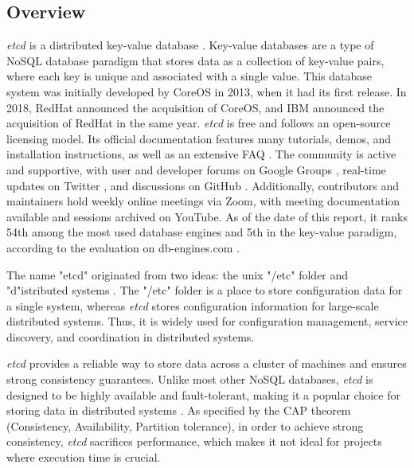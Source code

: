 \documentclass[screen,review]{acmart}
\begin{document}
\subsection{Overview}
\textit{etcd} is a distributed key-value database \cite{key}. Key-value databases are a type of NoSQL database paradigm that stores data as a collection of key-value pairs, where each key is unique and associated with a single value.
This database system was initially developed by CoreOS \cite{core} in 2013, when it had its first release. In 2018, RedHat announced the acquisition of CoreOS, and IBM \cite{ibm} announced the acquisition of RedHat \cite{red} in the same year.
\textit{etcd} is free and follows an open-source licensing model. Its official documentation \cite{documentation} features many tutorials, demos, and installation instructions, as well as an extensive FAQ \cite{etcd_faq}. The community \cite{com} is active and supportive, with user and developer forums on Google Groups \cite{google}, real-time updates on Twitter \cite{twitter}, and discussions on GitHub \cite{github}. Additionally, contributors and maintainers hold weekly online meetings via Zoom, with meeting documentation available and sessions archived on YouTube. As of the date of this report, it ranks 54th among the most used database engines and 5th in the key-value paradigm, according to the evaluation on db-engines.com \cite{db-engines}.

The name "etcd" originated from two ideas: the unix "/etc" folder and "d"istributed systems \cite{dbdb}. The "/etc" folder is a place to store configuration data for a single system, whereas \textit{etcd} stores configuration information for large-scale distributed systems. Thus, it is widely used for configuration management, service discovery, and coordination in distributed systems.

\textit{etcd} provides a reliable way to store data across a cluster of machines and ensures strong consistency guarantees. Unlike most other NoSQL databases, \textit{etcd} is designed to be highly available and fault-tolerant, making it a popular choice for storing data in distributed systems \cite{ibm} \cite{etcd_overview}. As specified by the CAP theorem \cite{ibm_CAP} (Consistency, Availability, Partition tolerance), in order to achieve strong consistency, \textit{etcd} sacrifices performance, which makes it not ideal for projects where execution time is crucial.
\end{document}
